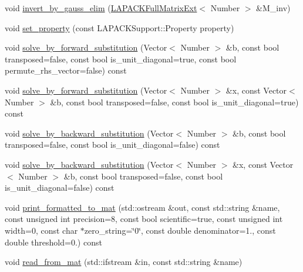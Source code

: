 \begin{DoxyCompactItemize}
\item 
void \hyperlink{classLAPACKFullMatrixExt_a13bbc430a0f60d4158d1693a2d7a0235}{invert\+\_\+by\+\_\+gauss\+\_\+elim} (\hyperlink{classLAPACKFullMatrixExt}{L\+A\+P\+A\+C\+K\+Full\+Matrix\+Ext}$<$ Number $>$ \&M\+\_\+inv)
\item 
void \hyperlink{classLAPACKFullMatrixExt_a604d19d69393d88430293b48aad71a3b}{set\+\_\+property} (const L\+A\+P\+A\+C\+K\+Support\+::\+Property property)
\item 
void \hyperlink{classLAPACKFullMatrixExt_a72a5ead3fac2a7c37a9d5a14a9d6b286}{solve\+\_\+by\+\_\+forward\+\_\+substitution} (Vector$<$ Number $>$ \&b, const bool transposed=false, const bool is\+\_\+unit\+\_\+diagonal=true, const bool permute\+\_\+rhs\+\_\+vector=false) const
\item 
void \hyperlink{classLAPACKFullMatrixExt_a865aa33c5a63bc68851e4685ce3b1379}{solve\+\_\+by\+\_\+forward\+\_\+substitution} (Vector$<$ Number $>$ \&x, const Vector$<$ Number $>$ \&b, const bool transposed=false, const bool is\+\_\+unit\+\_\+diagonal=true) const
\item 
void \hyperlink{classLAPACKFullMatrixExt_ac36f444148f8a0d3972867a0e79f887e}{solve\+\_\+by\+\_\+backward\+\_\+substitution} (Vector$<$ Number $>$ \&b, const bool transposed=false, const bool is\+\_\+unit\+\_\+diagonal=false) const
\item 
void \hyperlink{classLAPACKFullMatrixExt_ac81fbff25894b934408d8329c953ba5a}{solve\+\_\+by\+\_\+backward\+\_\+substitution} (Vector$<$ Number $>$ \&x, const Vector$<$ Number $>$ \&b, const bool transposed=false, const bool is\+\_\+unit\+\_\+diagonal=false) const
\item 
void \hyperlink{classLAPACKFullMatrixExt_aae17980cb1bd3802fdc4a629040b6ed7}{print\+\_\+formatted\+\_\+to\+\_\+mat} (std\+::ostream \&out, const std\+::string \&name, const unsigned int precision=8, const bool scientific=true, const unsigned int width=0, const char $\ast$zero\+\_\+string=\char`\"{}0\char`\"{}, const double denominator=1., const double threshold=0.) const
\item 
void \hyperlink{classLAPACKFullMatrixExt_a3188024ca9775667de38d03fd07ac525}{read\+\_\+from\+\_\+mat} (std\+::ifstream \&in, const std\+::string \&name)
\end{DoxyCompactItemize}
